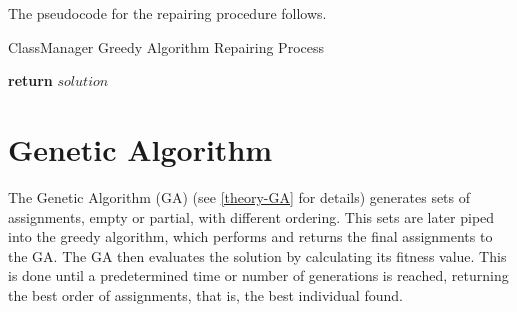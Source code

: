 The pseudocode for the repairing procedure follows.

\begin{algorithm}[H]
    \caption{ClassManager Greedy Algorithm Repairing Process}
    \begin{algorithmic}[1]
                         
                    \EndIf
                         
                    \Else
                         
                    \EndIf
                \EndFor
            \EndFor
            \State \textbf{return} $solution$
        \EndProcedure
    \end{algorithmic}
\end{algorithm}



\section{Genetic Algorithm}

The Genetic Algorithm (GA) (see \ref{theory-GA} for details) generates sets of assignments, empty or partial, with different ordering. This sets are later piped into the greedy algorithm, which performs and returns the final assignments to the GA. The GA then evaluates the solution by calculating its fitness value. This is done until a predetermined time or number of generations is reached, returning the best order of assignments, that is, the best individual found.

